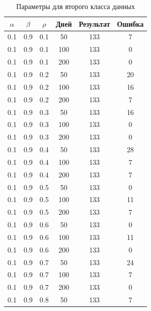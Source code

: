 \documentclass[a4paper,14pt, unknownkeysallowed]{extreport}
\begin{document}
\begin{center}
\captionsetup{justification=raggedright,singlelinecheck=off}
\begin{longtable}[c]{|c|c|c|c|c|c|}
\caption{Параметры для второго класса данных \label{tbl:table_kd2}}
		\\ \hline
		$\alpha$ & $\beta$ & $\rho$ & Дней & Результат & Ошибка 
		\\ \hline

        0.1 &  0.9 &  0.1 &   50 &   133 &     7 \\
         0.1 &  0.9 &  0.1 &  100 &   133 &     0 \\
         0.1 &  0.9 &  0.1 &  200 &   133 &     0 \\
        \hline
         0.1 &  0.9 &  0.2 &   50 &   133 &    20 \\
         0.1 &  0.9 &  0.2 &  100 &   133 &    16 \\
         0.1 &  0.9 &  0.2 &  200 &   133 &     7 \\
        \hline
         0.1 &  0.9 &  0.3 &   50 &   133 &    16 \\
         0.1 &  0.9 &  0.3 &  100 &   133 &     0 \\
         0.1 &  0.9 &  0.3 &  200 &   133 &     0 \\
        \hline
         0.1 &  0.9 &  0.4 &   50 &   133 &    28 \\
         0.1 &  0.9 &  0.4 &  100 &   133 &     7 \\
         0.1 &  0.9 &  0.4 &  200 &   133 &     7 \\
        \hline
         0.1 &  0.9 &  0.5 &   50 &   133 &     0 \\
         0.1 &  0.9 &  0.5 &  100 &   133 &    11 \\
         0.1 &  0.9 &  0.5 &  200 &   133 &     7 \\
        \hline
         0.1 &  0.9 &  0.6 &   50 &   133 &     0 \\
         0.1 &  0.9 &  0.6 &  100 &   133 &    11 \\
         0.1 &  0.9 &  0.6 &  200 &   133 &     0 \\
        \hline
         0.1 &  0.9 &  0.7 &   50 &   133 &    24 \\
         0.1 &  0.9 &  0.7 &  100 &   133 &     7 \\
         0.1 &  0.9 &  0.7 &  200 &   133 &     0 \\
        \hline
         0.1 &  0.9 &  0.8 &   50 &   133 &     7 \\

\end{longtable}
\end{center}
\end{document}
